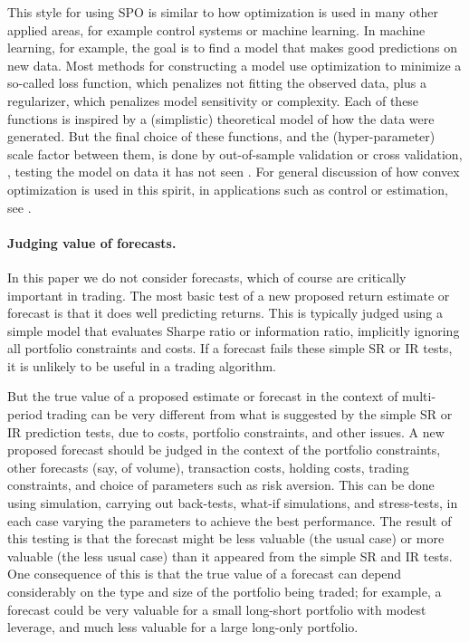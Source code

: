\documentclass[openany]{article}  %
\begin{document}
This style for using SPO
is similar to how optimization is used in many other applied areas,
for example control systems or machine learning.   In machine learning,
for example, the goal is to find a model that makes good predictions
on new data.
Most methods for constructing a model use optimization to minimize a
so-called loss function, which penalizes not fitting the observed data,
plus a regularizer, which penalizes model sensitivity or complexity.
Each of these functions is inspired by a (simplistic)
theoretical model of how the data were generated.  But the final choice of
these functions, and the (hyper-parameter)
scale factor between them, is done by out-of-sample
validation or cross validation, \ie, testing the model on data it has not seen \cite{friedman2001elements}.
For general discussion of how convex optimization is used in
this spirit, in applications such as control or estimation,
see \cite{boyd2004convex}.

\paragraph{Judging value of forecasts.}
In this paper we do not consider forecasts, which of course are
critically important in trading.
The most basic test of a new proposed return estimate or forecast is that it
does well predicting returns.  This is typically judged using a simple model
that evaluates Sharpe ratio or information ratio, implicitly ignoring all
portfolio constraints and costs.
If a forecast fails these simple SR or IR tests, it is unlikely to be useful
in a trading algorithm.

But the true value of a proposed estimate or forecast in
the context of multi-period trading can be very different from what is
suggested by the simple SR or IR prediction tests, due to costs,
portfolio constraints, and other issues.
A new proposed forecast should be judged in the context of the portfolio
constraints, other forecasts (say, of volume), transaction costs, holding
costs, trading constraints, and choice of parameters such as risk aversion.
This can be done using simulation,
carrying out back-tests, what-if simulations, and stress-tests,
in each case varying the parameters to achieve the best performance.
The result of this testing is that the forecast might be less valuable
(the usual case) or more valuable (the less usual case) than it appeared
from the simple SR and IR tests.
One consequence of this is that the true value of a forecast can depend
considerably on the type and size of the portfolio being traded; for example, a
forecast could be very valuable for a small long-short portfolio with modest
leverage, and much less valuable for a large long-only portfolio.
\end{document}
